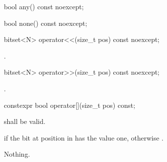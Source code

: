 \begin{itemdescr}
\pnum
\returns {}
\end{itemdescr}

%
\begin{itemdecl}
bool any() const noexcept;
\end{itemdecl}

\begin{itemdescr}
\pnum
\returns {}
\end{itemdescr}

%
\begin{itemdecl}
bool none() const noexcept;
\end{itemdecl}

\begin{itemdescr}
\pnum
\returns {}
\end{itemdescr}

%
%
\begin{itemdecl}
bitset<N> operator<<(size_t pos) const noexcept;
\end{itemdecl}

\begin{itemdescr}
\pnum
\returns
{}.
\end{itemdescr}

%
%
\begin{itemdecl}
bitset<N> operator>>(size_t pos) const noexcept;
\end{itemdecl}

\begin{itemdescr}
\pnum
\returns
{}.
\end{itemdescr}

\begin{itemdecl}
constexpr bool operator[](size_t pos) const;
\end{itemdecl}

\begin{itemdescr}
\pnum
\requires
{} shall be valid.

\pnum
\returns
{} if the bit at position  in  has the value
one, otherwise .

\pnum
\throws Nothing.
\end{itemdescr}

